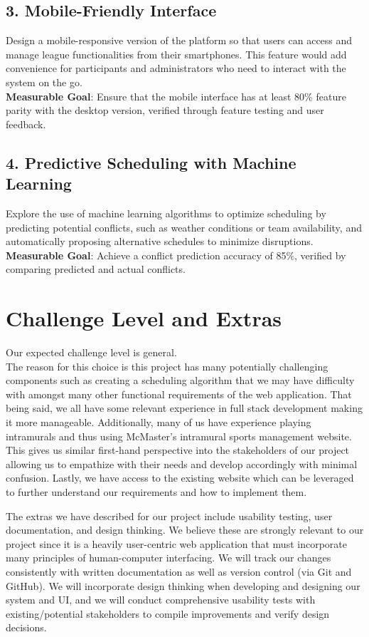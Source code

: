 \documentclass{article}
\begin{document}
\subsection*{3. Mobile-Friendly Interface}
Design a mobile-responsive version of the platform so that users can access and manage league functionalities from their smartphones. This feature would add convenience for participants and administrators who need to interact with the system on the go. \\
\textbf{Measurable Goal}: Ensure that the mobile interface has at least 80\% feature parity with the desktop version, verified through feature testing and user feedback.

\subsection*{4. Predictive Scheduling with Machine Learning}
Explore the use of machine learning algorithms to optimize scheduling by predicting potential conflicts, such as weather conditions or team availability, and automatically proposing alternative schedules to minimize disruptions. \\
\textbf{Measurable Goal}: Achieve a conflict prediction accuracy of 85\%, verified by comparing predicted and actual conflicts.

\pagebreak

\section{Challenge Level and Extras}

Our expected challenge level is general.\\
The reason for this choice is this project has many potentially challenging components such as creating a scheduling algorithm that we may have difficulty with amongst many other functional requirements of the web application. That being said, we all have some relevant experience in full stack development making it more manageable. Additionally, many of us have experience playing intramurals and thus using McMaster's intramural sports management website. This gives us similar first-hand perspective into the stakeholders of our project allowing us to empathize with their needs and develop accordingly with minimal confusion. Lastly, we have access to the existing website which can be leveraged to further understand our requirements and how to implement them.

The extras we have described for our project include usability testing, user documentation, and design thinking.
We believe these are strongly relevant to our project since it is a heavily user-centric web application that must incorporate many principles of human-computer interfacing. We will track our changes consistently with written documentation as well as version control (via Git and GitHub). We will incorporate design thinking when developing and designing our system and UI, and we will conduct comprehensive usability tests with existing/potential stakeholders to compile improvements and verify design decisions.
\end{document}
